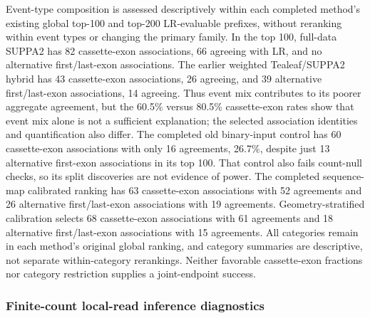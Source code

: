 \documentclass[11pt]{article}
\begin{document}
Event-type composition is assessed descriptively within each completed method's existing global top-100 and top-200 LR-evaluable prefixes, without reranking within event types or changing the primary family. In the top 100, full-data SUPPA2 has 82 cassette-exon associations, 66 agreeing with LR, and no alternative first/last-exon associations. The earlier weighted Tealeaf/SUPPA2 hybrid has 43 cassette-exon associations, 26 agreeing, and 39 alternative first/last-exon associations, 14 agreeing. Thus event mix contributes to its poorer aggregate agreement, but the 60.5\% versus 80.5\% cassette-exon rates show that event mix alone is not a sufficient explanation; the selected association identities and quantification also differ. The completed old binary-input control has 60 cassette-exon associations with only 16 agreements, 26.7\%, despite just 13 alternative first-exon associations in its top 100. That control also fails count-null checks, so its split discoveries are not evidence of power. The completed sequence-map calibrated ranking has 63 cassette-exon associations with 52 agreements and 26 alternative first/last-exon associations with 19 agreements. Geometry-stratified calibration selects 68 cassette-exon associations with 61 agreements and 18 alternative first/last-exon associations with 15 agreements. All categories remain in each method's original global ranking, and category summaries are descriptive, not separate within-category rerankings. Neither favorable cassette-exon fractions nor category restriction supplies a joint-endpoint success.

\subsubsection*{Finite-count local-read inference diagnostics}
\end{document}
